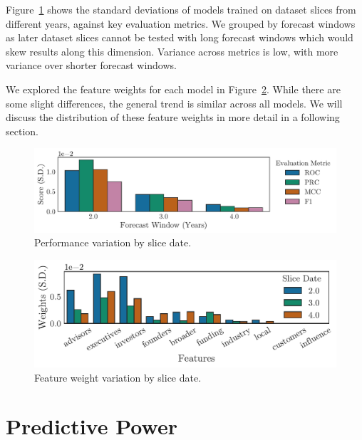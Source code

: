 \documentclass[../thesis/thesis.tex]{subfiles}
\begin{document}
Figure~\ref{fig:evaluation:performance_slice} shows the standard deviations of models trained on dataset slices from different years, against key evaluation metrics. We grouped by forecast windows as later dataset slices cannot be tested with long forecast windows which would skew results along this dimension. Variance across metrics is low, with more variance over shorter forecast windows.

We explored the feature weights for each model in Figure~\ref{fig:evaluation:features_slice}. While there are some slight differences, the general trend is similar across all models. We will discuss the distribution of these feature weights in more detail in a following section.

\begin{figure}[!htb]
    \centering
    \includegraphics[width=\textwidth]{../figures/evaluation/performance_slice}
    \caption[Performance variation by slice date]{Performance variation by slice date.}
    \label{fig:evaluation:performance_slice}
\end{figure}

\begin{figure}[!htb]
    \centering
    \includegraphics[width=\textwidth]{../figures/evaluation/features_slice}
    \caption[Feature weight variation by slice date]{Feature weight variation by slice date.}
    \label{fig:evaluation:features_slice}
\end{figure}

\section{Predictive Power}
\end{document}
